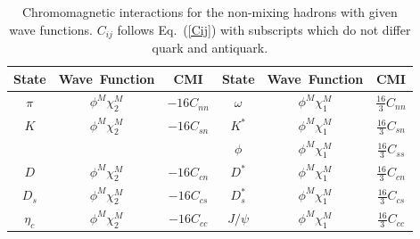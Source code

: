 \documentclass[prd,twocolumn,floatfix,nofootinbib]{revtex4}
\begin{document}
\renewcommand{\tabcolsep}{0.36cm}
\renewcommand{\arraystretch}{1.5}
\begin{table}[!htbp]
    \caption{Chromomagnetic interactions for the non-mixing hadrons with given wave functions. $C_{ij}$ follows Eq.~(\ref{Cij}) with subscripts which do not differ quark and antiquark.}
    \label{tab:CMI}
    \begin{tabular}{cccccc}
        \hline\hline
        {\rm State}     &{\rm Wave\ Function}       &{\rm CMI}      &{\rm State}        &{\rm Wave\ Function}       &{\rm CMI} \\ \hline
        $\pi$           &$\phi^{M}\chi_{2}^{M}$     &$-16C_{nn}$    &$\omega$           &$\phi^{M}\chi_{1}^{M}$     &$\frac{16}{3}C_{nn}$ \\
        $K$             &$\phi^{M}\chi_{2}^{M}$     &$-16C_{sn}$    &$K^{\ast}$         &$\phi^{M}\chi_{1}^{M}$     &$\frac{16}{3}C_{sn}$ \\
                        &                           &               &$\phi$             &$\phi^{M}\chi_{1}^{M}$     &$\frac{16}{3}C_{ss}$ \\
        $D$             &$\phi^{M}\chi_{2}^{M}$     &$-16C_{cn}$    &$D^{\ast}$         &$\phi^{M}\chi_{1}^{M}$     &$\frac{16}{3}C_{cn}$ \\
        $D_{s}$         &$\phi^{M}\chi_{2}^{M}$     &$-16C_{cs}$    &$D_{s}^{\ast}$     &$\phi^{M}\chi_{1}^{M}$     &$\frac{16}{3}C_{cs}$ \\
        $\eta_{c}$      &$\phi^{M}\chi_{2}^{M}$     &$-16C_{cc}$    &$J/\psi$           &$\phi^{M}\chi_{1}^{M}$     &$\frac{16}{3}C_{cc}$ \\


\end{tabular}
\end{table}
\end{document}
